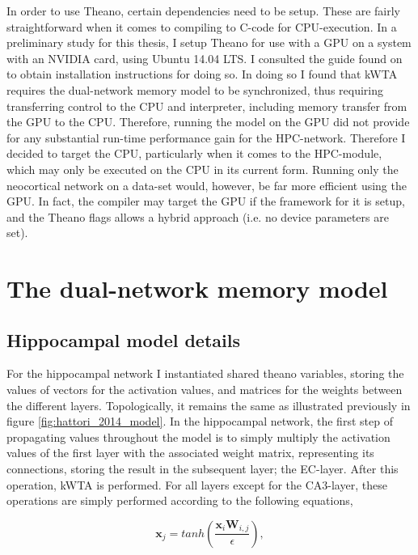 In order to use Theano, certain dependencies need to be setup. These are fairly straightforward when it comes to compiling to C-code for CPU-execution. In a preliminary study for this thesis, I setup Theano for use with a GPU on a system with an NVIDIA card, using Ubuntu 14.04 LTS. I consulted the guide found on \citep{LISA-lab2015b} to obtain installation instructions for doing so. In doing so I found that kWTA requires the dual-network memory model to be synchronized, thus requiring transferring control to the CPU and interpreter, including memory transfer from the GPU to the CPU. Therefore, running the model on the GPU did not provide for any substantial run-time performance gain for the HPC-network. Therefore I decided to target the CPU, particularly when it comes to the HPC-module, which may only be executed on the CPU in its current form. Running only the neocortical network on a data-set would, however, be far more efficient using the GPU. In fact, the compiler may target the GPU if the framework for it is setup, and the Theano flags allows a hybrid approach (i.e. no device parameters are set).


\section{The dual-network memory model}

\subsection{Hippocampal model details}

For the hippocampal network I instantiated shared theano variables, storing the values of vectors for the activation values, and matrices for the weights between the different layers. Topologically, it remains the same as illustrated previously in figure \ref{fig:hattori_2014_model}. In the hippocampal network, the first step of propagating values throughout the model is to simply multiply the activation values of the first layer with the associated weight matrix, representing its connections, storing the result in the subsequent layer; the EC-layer. After this operation, kWTA is performed. For all layers except for the CA3-layer, these operations are simply performed according to the following equations,

\begin{equation}\label{eq:transfer_function_hpc}
    \textbf{x}_j = tanh (\frac{\textbf{x}_i \textbf{W}_{i,j}}{\epsilon}),
\end{equation}

